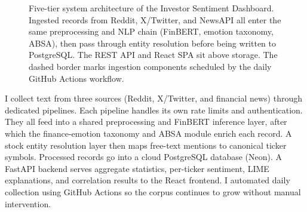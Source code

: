\begin{figure}[H]
{}
\caption{Five-tier system architecture of the Investor Sentiment Dashboard.  Ingested records from Reddit, X/Twitter, and NewsAPI all enter the same preprocessing and NLP chain (FinBERT, emotion taxonomy, ABSA), then pass through entity resolution before being written to PostgreSQL.  The REST API and React SPA sit above storage.  The dashed border marks ingestion components scheduled by the daily GitHub Actions workflow.}
\label{fig:system_architecture}
\end{figure}

I collect text from three sources (Reddit, X/Twitter, and financial news) through dedicated pipelines. Each pipeline handles its own rate limits and authentication. They all feed into a shared preprocessing and FinBERT inference layer, after which the finance-emotion taxonomy and ABSA module enrich each record. A stock entity resolution layer then maps free-text mentions to canonical ticker symbols. Processed records go into a cloud PostgreSQL database (Neon). A FastAPI backend serves aggregate statistics, per-ticker sentiment, LIME explanations, and correlation results to the React frontend. I automated daily collection using GitHub Actions so the corpus continues to grow without manual intervention.


